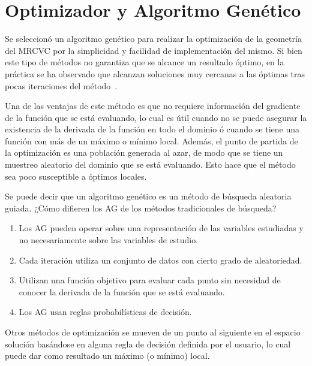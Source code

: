 \section{Optimizador y Algoritmo Genético}
%
%

Se seleccionó un algoritmo genético para realizar la optimización de la
geometría del MRCVC por la simplicidad y facilidad de implementación del mismo.
%
Si bien este tipo de métodos no garantiza que se alcance un resultado óptimo,
en la práctica se ha observado que alcanzan soluciones muy cercanas a las
óptimas tras pocas iteraciones del método~\parencite{goldberg}\parencite{shi}.

Una de las ventajas de este método es que no requiere información del gradiente
de la función que se está evaluando, lo cual es útil cuando no se puede asegurar
la existencia de la derivada de la función en todo el dominio ó cuando se tiene
una función con más de un máximo o mínimo local.
%
Además, el punto de partida de la optimización es una población generada al
azar, de modo que se tiene un muestreo aleatorio del dominio que se está
evaluando.
%
Esto hace que el método sea poco susceptible a óptimos locales.

Se puede decir que un algoritmo genético es un método de búsqueda aleatoria
guiada.
%
¿Cómo difieren los AG de los métodos tradicionales de búsqueda?
%
\begin{enumerate}
  \item Los AG pueden operar sobre una representación de las variables estudiadas y
no necesariamente sobre las variables de estudio.
  \item Cada iteración utiliza un conjunto de datos con cierto grado de
aleatoriedad.
  \item Utilizan una función objetivo para evaluar cada punto sin necesidad de
conocer la derivada de la función que se está evaluando.
  \item Los AG usan reglas probabilísticas de decisión.
\end{enumerate}

Otros métodos de optimización se mueven de un punto al siguiente en el espacio
solución basándose en alguna regla de decisión definida por el usuario, lo cual
puede dar como resultado un máximo (o mínimo) local.

